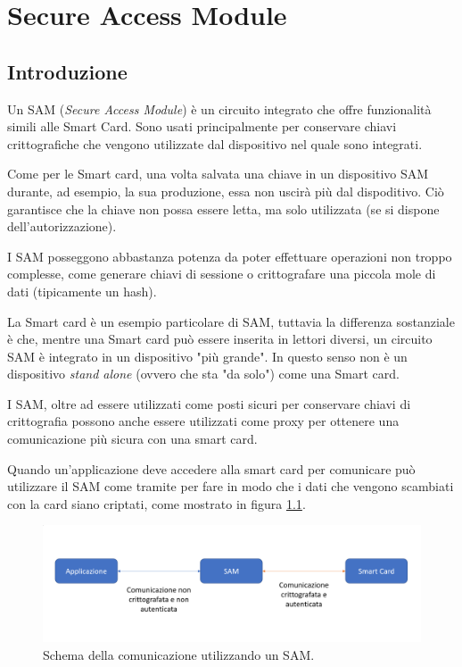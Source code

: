 \chapter{Secure Access Module}
\label{chapter3}

\section{Introduzione}
Un SAM (\textit{Secure Access Module}) è un circuito integrato che offre funzionalità simili alle Smart Card. Sono usati principalmente per conservare chiavi crittografiche che vengono utilizzate dal dispositivo nel quale sono integrati.

Come per le Smart card, una volta salvata una chiave in un dispositivo SAM durante, ad esempio, la sua produzione, essa non uscirà più dal dispoditivo. Ciò garantisce che la chiave non possa essere letta, ma solo utilizzata (se si dispone dell'autorizzazione).

I SAM posseggono abbastanza potenza da poter effettuare operazioni non troppo complesse, come generare chiavi di sessione o crittografare una piccola mole di dati (tipicamente un hash).

La Smart card è un esempio particolare di SAM, tuttavia la differenza sostanziale è che, mentre una Smart card può essere inserita in lettori diversi, un circuito SAM è integrato in un dispositivo "più grande". In questo senso non è un dispositivo \textit{stand alone} (ovvero che sta "da solo") come una Smart card.

I SAM, oltre ad essere utilizzati come posti sicuri per conservare chiavi di crittografia possono anche essere utilizzati come proxy per ottenere una comunicazione più sicura con una smart card.

Quando un'applicazione deve accedere alla smart card per comunicare può utilizzare il SAM come tramite per fare in modo che i dati che vengono scambiati con la card siano criptati, come mostrato in figura \ref{fig:proxy_sam}.

\begin{figure}[h!]
  \centering
  \includegraphics[width=410pt]{pictures/proxy_sam.png}
  \caption{Schema della comunicazione utilizzando un SAM.}
  \label{fig:proxy_sam}
\end{figure}

